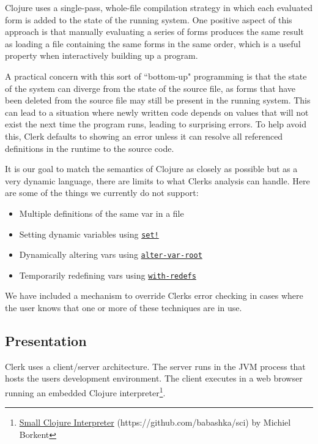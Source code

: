 \documentclass[sigconf,screen]{acmart}
\newcommand{\passthrough}[1]{#1}
\providecommand{\tightlist}{%
  \setlength{\itemsep}{0pt}\setlength{\parskip}{0pt}}
\begin{document}
Clojure uses a single-pass, whole-file compilation strategy in which each evaluated form is added to the state of the running system. One positive aspect of this approach is that manually evaluating a series of forms produces the same result as loading a file containing the same forms in the same order, which is a useful property when interactively building up a program.

A practical concern with this sort of ``bottom-up" programming is that the state of the system can diverge from the state of the source file, as forms that have been deleted from the source file may still be present in the running system. This can lead to a situation where newly written code depends on values that will not exist the next time the program runs, leading to surprising errors. To help avoid this, Clerk defaults to showing an error unless it can resolve all referenced definitions in the runtime to the source code.

It is our goal to match the semantics of Clojure as closely as possible but as a very dynamic language, there are limits to what Clerk\textquotesingle s analysis can handle. Here are some of the things we currently do not support:

\begin{itemize}
\tightlist
\item
  Multiple definitions of the same var in a file
\item
  Setting dynamic variables using {\href{https://clojuredocs.org/clojure.core/set!}{\passthrough{\lstinline"set!"}}}
\item
  Dynamically altering vars using {\href{https://clojuredocs.org/clojure.core/alter-var-root}{\passthrough{\lstinline!alter-var-root!}}}
\item
  Temporarily redefining vars using {\href{https://clojuredocs.org/clojure.core/with-redefs}{\passthrough{\lstinline!with-redefs!}}}
\end{itemize}

We have included a mechanism to override Clerk\textquotesingle s error checking in cases where the user knows that one or more of these techniques are in use.

\hypertarget{presentation}{%
\subsection{Presentation}\label{presentation}}

Clerk uses a client/server architecture. The server runs in the JVM process that hosts the user\textquotesingle s development environment. The client executes in a web browser running an embedded Clojure interpreter\footnote{{\href{https://github.com/babashka/sci}{Small Clojure Interpreter} (https://github.com/babashka/sci)} by Michiel Borkent}.
\end{document}
